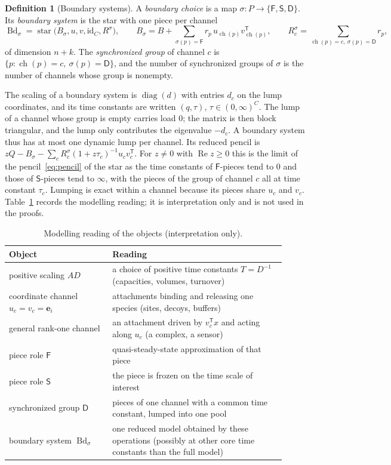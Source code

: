 \documentclass[11pt,a4paper]{article}
\theoremstyle{plain}
\theoremstyle{definition}
\newtheorem{definition}[theorem]{Definition}
\theoremstyle{remark}
\newcommand{\Real}{\operatorname{Re}}
\newcommand{\diag}{\operatorname{diag}}
\newcommand{\Bd}{\operatorname{Bd}}
\newcommand{\ch}{\operatorname{ch}}
\newcommand{\be}{\mathbf{e}}
\newcommand{\rF}{\mathsf{F}}
\newcommand{\rS}{\mathsf{S}}
\newcommand{\rD}{\mathsf{D}}
\newcommand{\T}{\mathsf{T}}
\begin{document}
\begin{definition}[Boundary systems]\label{def:boundary}
A \emph{boundary choice} is a map $\sigma\colon P\to\{\rF,\rS,\rD\}$. Its
\emph{boundary system} is the star with one piece per channel
\[
  \Bd_\sigma=\operatorname{star}\bigl(B_\sigma,u,v,\mathrm{id}_C,R^\sigma\bigr),\qquad
  B_\sigma=B+\sum_{\sigma(p)=\rF}r_p\,u_{\ch(p)}v_{\ch(p)}^\T,\qquad
  R^\sigma_c=\sum_{\ch(p)=c,\ \sigma(p)=\rD}r_p ,
\]
of dimension $n+k$. The \emph{synchronized group} of channel $c$ is
$\{p:\ch(p)=c,\ \sigma(p)=\rD\}$, and the number of synchronized groups of $\sigma$ is the
number of channels whose group is nonempty.
\end{definition}

The scaling of a boundary system is $\diag(d)$ with entries $d_c$ on the lump coordinates,
and its time constants are written $(q,\tau)$, $\tau\in(0,\infty)^C$. The lump of a channel
whose group is empty carries load $0$; the matrix is then block triangular, and the lump
only contributes the eigenvalue $-d_c$. A boundary system thus has at most one dynamic lump
per channel. Its reduced pencil is $zQ-B_\sigma-\sum_cR^\sigma_c(1+z\tau_c)^{-1}u_cv_c^\T$.
For $z\ne0$ with $\Real z\ge0$ this is the limit of the pencil~\eqref{eq:pencil} of the star
as the time constants of $\rF$-pieces tend to $0$ and those of $\rS$-pieces tend to
$\infty$, with the pieces of the group of channel $c$ all at time constant $\tau_c$. Lumping
is exact within a channel because its pieces share $u_c$ and $v_c$. Table~\ref{tab:dictionary}
records the modelling reading; it is interpretation only and is not used in the proofs.

\begin{table}[tb]
\centering\small
\caption{Modelling reading of the objects (interpretation only).}\label{tab:dictionary}
\begin{tabular}{@{}p{0.34\linewidth}p{0.58\linewidth}@{}}
\toprule
Object & Reading\\
\midrule
positive scaling $AD$ & a choice of positive time constants $T=D^{-1}$ (capacities, volumes, turnover)\\
coordinate channel $u_c=v_c=\be_i$ & attachments binding and releasing one species (sites, decoys, buffers)\\
general rank-one channel & an attachment driven by $v_c^\T x$ and acting along $u_c$ (a complex, a sensor)\\
piece role $\rF$ & quasi-steady-state approximation of that piece\\
piece role $\rS$ & the piece is frozen on the time scale of interest\\
synchronized group $\rD$ & pieces of one channel with a common time constant, lumped into one pool\\
boundary system $\Bd_\sigma$ & one reduced model obtained by these operations (possibly at other core time constants than the full model)\\
\bottomrule
\end{tabular}
\end{table}
\end{document}
